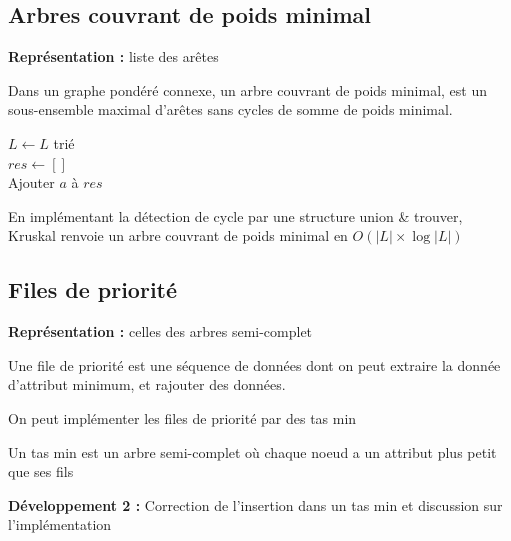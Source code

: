 \subsection{Arbres couvrant de poids minimal}

\noindent \textbf{Représentation :} liste des arêtes

\begin{definition}
	Dans un graphe pondéré connexe, un arbre couvrant de poids minimal, est un sous-ensemble maximal d'arêtes sans cycles de somme de poids minimal.
\end{definition}

\begin{algorithm}[H]
	\caption{$Kruskal(L)$}
	$L\gets L$ trié\\
	$res \gets []$\\
	{
		{
			Ajouter $a$ à $res$
		}
	}
\end{algorithm}

\begin{proposition}
	En implémentant la détection de cycle par une structure union \& trouver, Kruskal renvoie un arbre couvrant de poids minimal en $O(|L| \times \log |L|)$
\end{proposition}

\subsection{Files de priorité}

\noindent \textbf{Représentation :} celles des arbres semi-complet

\begin{definition}
	Une file de priorité est une séquence de données dont on peut extraire la donnée d'attribut minimum, et rajouter des données.
\end{definition}

\begin{idee}
	On peut implémenter les files de priorité par des tas min
\end{idee}

\begin{definition}
	Un tas min est un arbre semi-complet où chaque noeud a un attribut plus petit que ses fils
\end{definition}

\noindent \textbf{Développement 2 :} Correction de l'insertion dans un tas min et discussion sur l'implémentation

